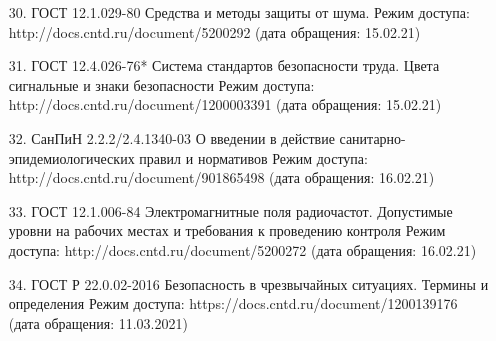 \begin{itemize}[leftmargin=1.6\parindent, wide]
\item[30.] ГОСТ 12.1.029-80 Средства и методы защиты от шума. Режим доступа: http://docs.cntd.ru/document/5200292 (дата обращения: 15.02.21)
\item[31.] ГОСТ  12.4.026-76*  Система  стандартов  безопасности  труда.  Цвета сигнальные    и    знаки    безопасности Режим    доступа: http://docs.cntd.ru/document/1200003391 (дата обращения: 15.02.21)
\item[32.] СанПиН  2.2.2/2.4.1340-03  О  введении  в  действие  санитарно-эпидемиологических   правил   и   нормативов Режим   доступа: http://docs.cntd.ru/document/901865498 (дата обращения: 16.02.21)
\item[33.] ГОСТ  12.1.006-84  Электромагнитные поля  радиочастот.  Допустимые уровни  на  рабочих  местах  и  требования  к  проведению  контроля Режим доступа: http://docs.cntd.ru/document/5200272 (дата обращения: 16.02.21)
\item[34.] ГОСТ Р 22.0.02-2016  Безопасность  в  чрезвычайных  ситуациях. Термины и определения Режим доступа: https://docs.cntd.ru/document/1200139176 (дата обращения: 11.03.2021)
 \end{itemize}